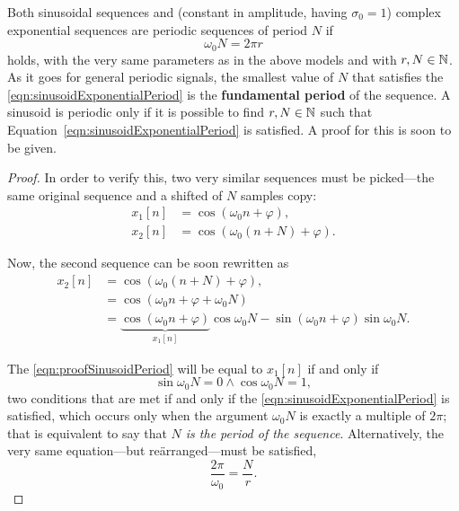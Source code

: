 \documentclass[\documentfontsize, twocolumn]{\classname}
\begin{document}
Both sinusoidal se\-quen\-ces and (constant in amplitude, having $\sigma_0 = 1$) complex exponential se\-quen\-ces are periodic se\-quen\-ces of period $N$ if
\begin{equation}\label{eqn:sinusoidExponentialPeriod}
\omega_0 N = 2\pi r
\end{equation}
holds, with the very same parameters as in the above models and with $r,N \in \mathbb N$. As it goes for general periodic signals, the smallest value of $N$ that satisfies the \ref{eqn:sinusoidExponentialPeriod} is the \textbf{fundamental period} of the se\-quen\-ce. A sinusoid is periodic only if it is possible to find $r, N \in \mathbb N$ such that Equation~\ref{eqn:sinusoidExponentialPeriod} is satisfied. A proof for this is soon to be given.
\begin{proof}
In order to verify this, two very similar se\-quen\-ces must be picked---the same original se\-quen\-ce and a shifted of $N$ samples copy:
\begin{align}
    x_1[n] &= \cos{(\omega_0 n + \varphi)},\\
    x_2[n] &= \cos{(\omega_0 (n + N) + \varphi)}.
\end{align}

Now, the second se\-quen\-ce can be soon rewritten as
\begin{align}
    x_2[n] &= \cos{(\omega_0 (n + N) + \varphi)},\\
           &= \cos{(\omega_0 n + \varphi + \omega_0 N)}\\
           &= \underbrace{\cos{(\omega_0 n + \varphi)}}_{x_1[n]}\cos{\omega_0 N} - \sin{(\omega_0 n + \varphi)}\sin{\omega_0 N}.\label{eqn:proofSinusoidPeriod}
\end{align}

    The \ref{eqn:proofSinusoidPeriod} will be equal to $x_1[n]$ if and only if \begin{equation}\sin{\omega_0 N} = 0 \wedge \cos{\omega_0 N} = 1,\end{equation} two conditions that are met if and only if the \ref{eqn:sinusoidExponentialPeriod} is satisfied, which occurs only when the argument $\omega_0 N$ is exactly a multiple of $2\pi$; that is equivalent to say that \emph{$N$ is the period of the sequence}. Alternatively, the very same equation---but re\-\"ar\-ran\-ged---must be satisfied,
\begin{equation}\label{eqn:sinusoidExponentialPeriodFraction}
    \frac{2\pi}{\omega_0} = \frac{N}{r}.
\end{equation}
\end{proof}
\end{document}
